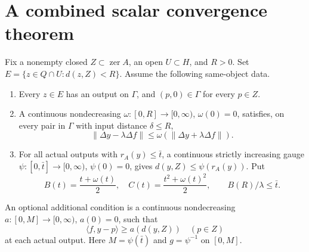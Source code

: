 \documentclass[11pt]{article}
\newcommand{\norm}[1]{\left\lVert#1\right\rVert}
\newcommand{\ip}[2]{\langle#1,#2\rangle}
\newcommand{\zer}{\operatorname{zer}}
\theoremstyle{remark}
\begin{document}
\section{A combined scalar convergence theorem}
Fix a nonempty closed $Z\subset\zer A$, an open $U\subset H$, and $R>0$.
Set $E=\{z\in Q\cap U:d(z,Z)<R\}$. Assume the following same-object data.
\begin{enumerate}
\item Every $z\in E$ has an output on $\Gamma$, and $(p,0)\in\Gamma$
for every $p\in Z$.
\item A continuous nondecreasing $\omega:[0,R]\to[0,\infty)$,
$\omega(0)=0$, satisfies, on every pair in $\Gamma$ with input distance
$\delta\le R$,
\begin{equation}\label{eq:rl}
 \norm{\Delta y-\lambda\Delta f}
 \le\omega(\norm{\Delta y+\lambda\Delta f}).
\end{equation}
\item For all actual outputs with $r_A(y)\le\bar t$, a continuous
strictly increasing gauge $\psi:[0,\bar t]\to[0,\infty)$, $\psi(0)=0$,
gives $d(y,Z)\le\psi(r_A(y))$. Put
\begin{equation}\label{eq:bc}
 B(t)=\frac{t+\omega(t)}2,\quad
 C(t)=\frac{t^2+\omega(t)^2}2,\qquad B(R)/\lambda\le\bar t.
\end{equation}
\end{enumerate}
An optional additional condition is a continuous nondecreasing
$a:[0,M]\to[0,\infty)$, $a(0)=0$, such that
\begin{equation}\label{eq:anchor}
 \ip f{y-p}\ge a(d(y,Z))\quad(p\in Z)
\end{equation}
at each actual output. Here $M=\psi(\bar t)$ and $g=\psi^{-1}$ on $[0,M]$.
\end{document}
